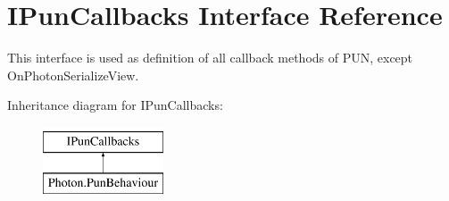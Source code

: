 \hypertarget{interface_i_pun_callbacks}{}\section{I\+Pun\+Callbacks Interface Reference}
\label{interface_i_pun_callbacks}


This interface is used as definition of all callback methods of P\+UN, except On\+Photon\+Serialize\+View.  


Inheritance diagram for I\+Pun\+Callbacks\+:\begin{figure}[H]
\begin{center}
\leavevmode
\includegraphics[height=2.000000cm]{interface_i_pun_callbacks}
\end{center}
\end{figure}
